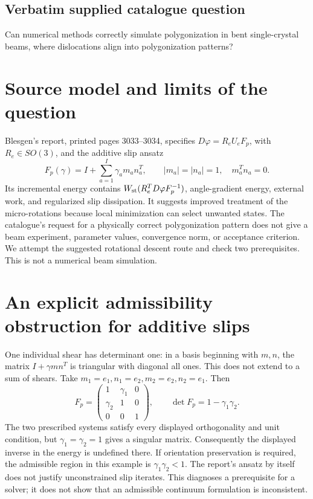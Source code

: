 \documentclass[11pt]{article}
\begin{document}
\subsection{Verbatim supplied catalogue question}
Can numerical methods correctly simulate polygonization in bent single-crystal beams, where dislocations align into polygonization patterns?

\section{Source model and limits of the question}
Blesgen's report, printed pages 3033--3034, specifies
$D\varphi=R_eU_eF_p$, with $R_e\in SO(3)$, and the additive slip ansatz
\[
F_p(\gamma)=I+\sum_{a=1}^I\gamma_a m_a n_a^T,
\qquad |m_a|=|n_a|=1,\quad m_a^Tn_a=0.
\]
Its incremental energy contains
$W_{\rm st}(R_e^TD\varphi F_p^{-1})$, angle-gradient energy, external work,
and regularized slip dissipation. It suggests improved treatment of the
micro-rotations because local minimization can select unwanted states.
The catalogue's request for a physically correct polygonization pattern
does not give a beam experiment, parameter values, convergence norm, or
acceptance criterion. We attempt the suggested rotational descent route and
check two prerequisites. This is not a numerical beam simulation.

\section{An explicit admissibility obstruction for additive slips}
One individual shear has determinant one: in a basis beginning with
$m,n$, the matrix $I+\gamma mn^T$ is triangular with diagonal all ones.
This does not extend to a sum of shears. Take
$m_1=e_1,n_1=e_2,m_2=e_2,n_2=e_1$. Then
\[
F_p=\begin{pmatrix}1&\gamma_1&0\\\gamma_2&1&0\\0&0&1\end{pmatrix},
\qquad \det F_p=1-\gamma_1\gamma_2.
\]
The two prescribed systems satisfy every displayed orthogonality and unit
condition, but $\gamma_1=\gamma_2=1$ gives a singular matrix. Consequently
the displayed inverse in the energy is undefined there. If orientation
preservation is required, the admissible region in this example is
$\gamma_1\gamma_2<1$. The report's ansatz by itself does not justify
unconstrained slip iterates. This diagnoses a prerequisite for a solver;
it does not show that an admissible continuum formulation is inconsistent.
\end{document}
